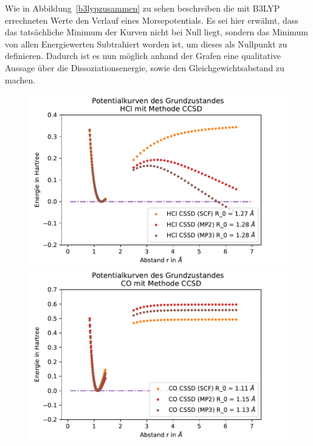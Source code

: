 Wie in Abbildung~\ref{b3lypzusammen} zu sehen beschreiben die mit B3LYP errechneten Werte den Verlauf eines Morsepotentials. Es sei hier erwähnt, dass das tatsächliche Minimum der Kurven nicht bei Null liegt, sondern das Minimum von allen Energiewerten Subtrahiert worden ist, um dieses als Nullpunkt zu definieren. Dadurch ist es nun möglich anhand der Grafen eine qualitative Aussage über die Dissoziationsenergie, sowie den Gleichgewichtsabstand zu machen.


  

 
\begin{figure}[H]
	
\begin{minipage}{0.5\textwidth}
	\includegraphics[width=\textwidth]{Bilder/HCl_CCSD}
\end{minipage}
\begin{minipage}{0.5\textwidth}
	\includegraphics[width=\textwidth]{Bilder/CO_CCSD}
\end{minipage}



\end{figure}
